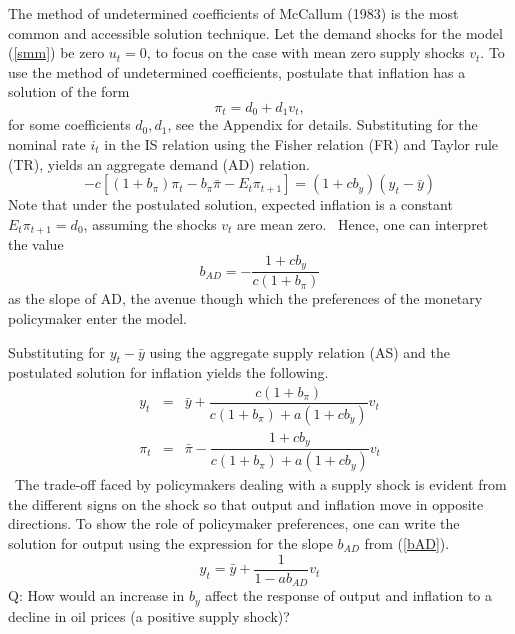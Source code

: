 \documentclass{article}
\begin{document}
\begin{doublespace}
The method of undetermined coefficients of McCallum (1983) is the most
common and accessible solution technique. Let the demand shocks for the
model (\ref{smm}) be zero $u_{t}=0$, to focus on the case with mean zero
supply shocks $v_{t}$. To use the method of undetermined coefficients,
postulate that inflation has a solution of the form%
\begin{equation*}
\pi _{t}=d_{0}+d_{1}v_{t},
\end{equation*}%
for some coefficients $d_{0},d_{1}$, see the Appendix for details.
Substituting for the nominal rate $i_{t}$ in the IS relation using the
Fisher relation (FR) and Taylor rule (TR), yields an aggregate demand (AD)
relation.%
\begin{equation}
-c\left[ \left( 1+b_{\pi }\right) \pi _{t}-b_{\pi }\bar{\pi}-E_{t}\pi _{t+1}%
\right] =\left( 1+cb_{y}\right) \left( y_{t}-\bar{y}\right)  \label{AD RE}
\end{equation}%
Note that under the postulated solution, expected inflation is a constant $%
E_{t}\pi _{t+1}=d_{0}$, assuming the shocks $v_{t}$ are mean zero. \ Hence,
one can interpret the value%
\begin{equation}
b_{AD}=-\frac{1+cb_{y}}{c\left( 1+b_{\pi }\right) }  \label{bAD}
\end{equation}%
as the slope of AD, the avenue though which the preferences of the monetary
policymaker enter the model.

Substituting for $y_{t}-\bar{y}$ using the aggregate supply relation (AS)
and the postulated solution for inflation yields the following.%
\begin{eqnarray*}
y_{t} &=&\bar{y}+\dfrac{c\left( 1+b_{\pi }\right) }{c\left( 1+b_{\pi
}\right) +a\left( 1+cb_{y}\right) }v_{t} \\
\pi _{t} &=&\bar{\pi}-\dfrac{1+cb_{y}}{c\left( 1+b_{\pi }\right) +a\left(
1+cb_{y}\right) }v_{t}
\end{eqnarray*}%
\ The trade-off faced by policymakers dealing with a supply shock is evident
from the different signs on the shock so that output and inflation move in
opposite directions. To show the role of policymaker preferences, one can
write the solution for output using the expression for the slope $b_{AD}$
from (\ref{bAD}).%
\begin{equation*}
y_{t}=\bar{y}+\frac{1}{1-ab_{AD}}v_{t}
\end{equation*}%
Q: How would an increase in $b_{y}$ affect the response of output and
inflation to a decline in oil prices (a positive supply shock)?


\end{doublespace}
\end{document}
